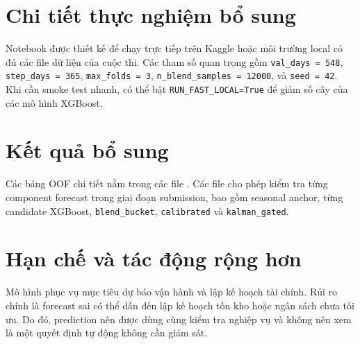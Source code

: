 \appendix

\section{Chi tiết thực nghiệm bổ sung}

Notebook được thiết kế để chạy trực tiếp trên Kaggle hoặc môi trường local có
đủ các file dữ liệu của cuộc thi. Các tham số quan trọng gồm
\texttt{val\_days = 548}, \texttt{step\_days = 365},
\texttt{max\_folds = 3}, \texttt{n\_blend\_samples = 12000}, và
\texttt{seed = 42}. Khi cần smoke test nhanh, có thể bật
\texttt{RUN\_FAST\_LOCAL=True} để giảm số cây của
các mô hình XGBoost.

\section{Kết quả bổ sung}

Các bảng OOF chi tiết nằm trong các file . Các file
 cho phép kiểm tra từng component forecast
trong giai đoạn submission, bao gồm seasonal anchor, từng candidate XGBoost,
\texttt{blend\_bucket}, \texttt{calibrated} và \texttt{kalman\_gated}.

\section{Hạn chế và tác động rộng hơn}

Mô hình phục vụ mục tiêu dự báo vận hành và lập kế hoạch tài chính. Rủi ro chính
là forecast sai có thể dẫn đến lập kế hoạch tồn kho hoặc ngân sách chưa tối ưu.
Do đó, prediction nên được dùng cùng kiểm tra nghiệp vụ và không nên xem là một
quyết định tự động không cần giám sát.

